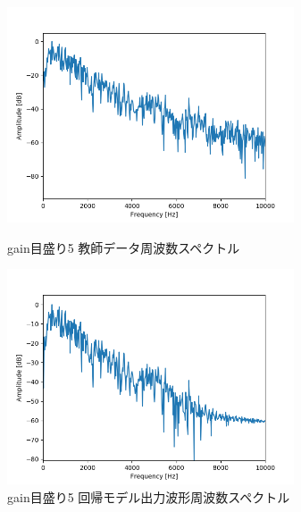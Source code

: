 \documentclass{jreport}		%
\begin{document}
\newpage
\begin{figure}[htbp]
 \begin{minipage}{0.5\hsize}
  \begin{center}
   \includegraphics[width=85mm]{gain5_fft.png}
  \end{center}
  \caption{gain目盛り5 教師データ周波数スペクトル}
  \label{fig:one}
 \end{minipage}
 \begin{minipage}{0.5\hsize}
  \begin{center}
   \includegraphics[width=85mm]{gain5_predict_fft.png}
  \end{center}
  \caption{gain目盛り5 回帰モデル出力波形周波数スペクトル}
  \label{fig:two}
 \end{minipage}
\end{figure}
\end{document}
